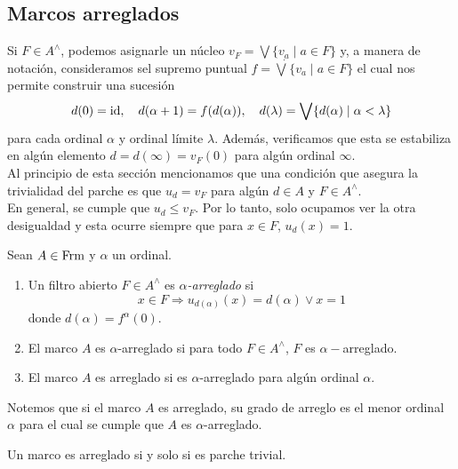 \subsection{Marcos arreglados}

Si $F\in A^\wedge$, podemos asignarle un núcleo $v_F=\bigvee \{v_a\mid a\in F\}$ y, a manera de notación, consideramos sel supremo puntual $f=\dot{\bigvee}\{v_a\mid a\in F\}$ el cual nos permite construir una sucesión 
\[
d(0)=\mathrm{id}, \quad d(\alpha +1)=f(d(\alpha)),\quad d(\lambda)=\bigvee\{d(\alpha)\mid \alpha <\lambda\}
\]
para cada ordinal $\alpha$ y ordinal límite $\lambda$. Además, verificamos que esta se estabiliza en algún elemento $d=d(\infty)=v_F(0)$ para algún ordinal $\infty$.\\

Al principio de esta sección mencionamos que una condición que asegura la trivialidad del parche es que $u_d=v_F$ para algún $d\in A$ y $F\in A^\wedge$.\\

En general, se cumple que $u_d\leq v_F$. Por lo tanto, solo ocupamos ver la otra desigualdad y esta ocurre siempre que para $x\in F$, $u_d(x)=1$. 

\begin{dfn}\label{Definición8.2.1}
    Sean $A\in \mathrm{Frm}$ y $\alpha$ un ordinal. 
    \begin{enumerate}
        \item Un filtro abierto $F\in A^\wedge$ es \emph{$\alpha$-arreglado} si 
    \[
    x\in F\Rightarrow u_{d(\alpha)}(x)=d(\alpha)\vee x=1
    \]
    donde $d(\alpha)=f^\alpha(0)$.
    
    \item El marco $A$ es $\alpha$-arreglado si para todo $F\in A^\wedge$, $F$ es $\alpha-$arreglado.

    \item El marco $A$ es arreglado si es $\alpha$-arreglado para algún ordinal $\alpha$.
    \end{enumerate}
\end{dfn}

Notemos que si el marco $A$ es arreglado, su grado de arreglo es el menor ordinal $\alpha$ para el cual se cumple que $A$ es $\alpha$-arreglado.

\begin{lem}\label{Lema8.2.2}
    Un marco es arreglado si y solo si es parche trivial.
\end{lem}

